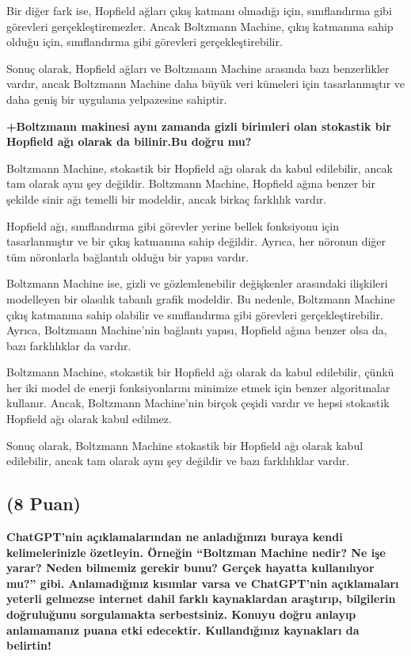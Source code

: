 \documentclass[11pt]{article}
\begin{document}
Bir diğer fark ise, Hopfield ağları çıkış katmanı olmadığı için, sınıflandırma gibi görevleri gerçekleştiremezler. Ancak Boltzmann Machine, çıkış katmanına sahip olduğu için, sınıflandırma gibi görevleri gerçekleştirebilir.

Sonuç olarak, Hopfield ağları ve Boltzmann Machine arasında bazı benzerlikler vardır, ancak Boltzmann Machine daha büyük veri kümeleri için tasarlanmıştır ve daha geniş bir uygulama yelpazesine sahiptir.

\textbf{+Boltzmann makinesi aynı zamanda gizli birimleri olan stokastik bir Hopfield ağı olarak da bilinir.Bu doğru mu?}

Boltzmann Machine, stokastik bir Hopfield ağı olarak da kabul edilebilir, ancak tam olarak aynı şey değildir. Boltzmann Machine, Hopfield ağına benzer bir şekilde sinir ağı temelli bir modeldir, ancak birkaç farklılık vardır.

Hopfield ağı, sınıflandırma gibi görevler yerine bellek fonksiyonu için tasarlanmıştır ve bir çıkış katmanına sahip değildir. Ayrıca, her nöronun diğer tüm nöronlarla bağlantılı olduğu bir yapısı vardır.

Boltzmann Machine ise, gizli ve gözlemlenebilir değişkenler arasındaki ilişkileri modelleyen bir olasılık tabanlı grafik modeldir. Bu nedenle, Boltzmann Machine çıkış katmanına sahip olabilir ve sınıflandırma gibi görevleri gerçekleştirebilir. Ayrıca, Boltzmann Machine'nin bağlantı yapısı, Hopfield ağına benzer olsa da, bazı farklılıklar da vardır.

Boltzmann Machine, stokastik bir Hopfield ağı olarak da kabul edilebilir, çünkü her iki model de enerji fonksiyonlarını minimize etmek için benzer algoritmalar kullanır. Ancak, Boltzmann Machine'nin birçok çeşidi vardır ve hepsi stokastik Hopfield ağı olarak kabul edilmez.

Sonuç olarak, Boltzmann Machine stokastik bir Hopfield ağı olarak kabul edilebilir, ancak tam olarak aynı şey değildir ve bazı farklılıklar vardır.



\subsection{(8 Puan)} \textbf{ChatGPT’nin açıklamalarından ne anladığınızı buraya kendi kelimelerinizle özetleyin. Örneğin ``Boltzman Machine nedir? Ne işe yarar? Neden bilmemiz gerekir bunu? Gerçek hayatta kullanılıyor mu?'' gibi. Anlamadığınız kısımlar varsa ve ChatGPT’nin açıklamaları yeterli gelmezse internet dahil farklı kaynaklardan araştırıp, bilgilerin doğruluğunu sorgulamakta serbestsiniz. Konuyu doğru anlayıp anlamamanız puana etki edecektir. Kullandığınız kaynakları da belirtin!}
\end{document}
